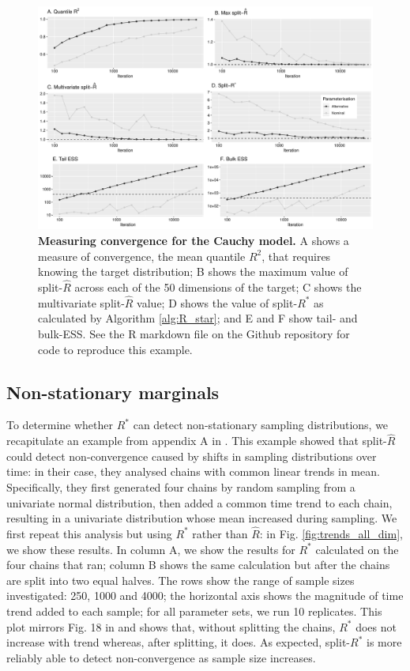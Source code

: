 \documentclass{article}
\begin{document}
\begin{figure}[!htb]
	\centerline{\includegraphics[width=1.0\textwidth]{../output/cauchy_convergence.pdf}}
	\caption{\textbf{Measuring convergence for the Cauchy model.} A shows a measure of convergence, the mean quantile $R^2$, that requires knowing the target distribution; B shows the maximum value of split-$\widehat{R}$ across each of the 50 dimensions of the target; C shows the multivariate split-$\widehat{R}$ value; D shows the value of split-$R^*$ as calculated by Algorithm \ref{alg:R_star}; and E and F show tail- and bulk-ESS. See the R markdown file on the Github repository for code to reproduce this example.}
	\label{fig:cauchy_convergence}
\end{figure}

\subsection{Non-stationary marginals}
To determine whether $R^*$ can detect non-stationary sampling distributions, we recapitulate an example from appendix A in \cite{vehtari2019rank}. This example showed that split-$\widehat{R}$ could detect non-convergence caused by shifts in sampling distributions over time: in their case, they analysed chains with common linear trends in mean. Specifically, they first generated four chains by random sampling from a univariate normal distribution, then added a common time trend to each chain, resulting in a univariate distribution whose mean increased during sampling. We first repeat this analysis but using $R^*$ rather than $\widehat{R}$: in Fig. \ref{fig:trends_all_dim}, we show these results. In column A, we show the results for $R^*$ calculated on the four chains that ran; column B shows the same calculation but after the chains are split into two equal halves. The rows show the range of sample sizes investigated: 250, 1000 and 4000; the horizontal axis shows the magnitude of time trend added to each sample; for all parameter sets, we run 10 replicates. This plot mirrors Fig. 18 in \cite{vehtari2019rank} and shows that, without splitting the chains, $R^*$ does not increase with trend whereas, after splitting, it does. As expected, split-$R^*$ is more reliably able to detect non-convergence as sample size increases.
\end{document}

